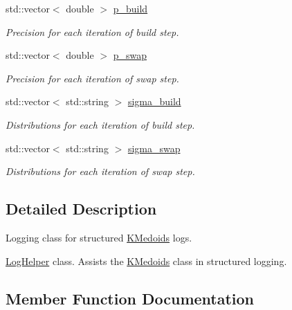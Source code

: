 \begin{DoxyCompactItemize}
\mbox{\label{structLogHelper_aed75dac28380b3f67b777d6b36719aa9}} 
std\+::vector$<$ double $>$ \hyperlink{structLogHelper_aed75dac28380b3f67b777d6b36719aa9}{p\+\_\+build}
\begin{DoxyCompactList}\small\item\em Precision for each iteration of build step. \end{DoxyCompactList}\item 
\mbox{\label{structLogHelper_a87a35e651ad2a32092777e1d9bd4acfa}} 
std\+::vector$<$ double $>$ \hyperlink{structLogHelper_a87a35e651ad2a32092777e1d9bd4acfa}{p\+\_\+swap}
\begin{DoxyCompactList}\small\item\em Precision for each iteration of swap step. \end{DoxyCompactList}\item 
\mbox{\label{structLogHelper_a835a54928567970dd564d9eaed87597c}} 
std\+::vector$<$ std\+::string $>$ \hyperlink{structLogHelper_a835a54928567970dd564d9eaed87597c}{sigma\+\_\+build}
\begin{DoxyCompactList}\small\item\em Distributions for each iteration of build step. \end{DoxyCompactList}\item 
\mbox{\label{structLogHelper_afee211952d9a61c217622557e91c1275}} 
std\+::vector$<$ std\+::string $>$ \hyperlink{structLogHelper_afee211952d9a61c217622557e91c1275}{sigma\+\_\+swap}
\begin{DoxyCompactList}\small\item\em Distributions for each iteration of swap step. \end{DoxyCompactList}\end{DoxyCompactItemize}


\subsection{Detailed Description}
Logging class for structured \hyperlink{classKMedoids}{K\+Medoids} logs. 

\hyperlink{structLogHelper}{Log\+Helper} class. Assists the \hyperlink{classKMedoids}{K\+Medoids} class in structured logging. 

\subsection{Member Function Documentation}
\mbox{\label{structLogHelper_a4624149f53c4577d0565f761c155d800}} 

